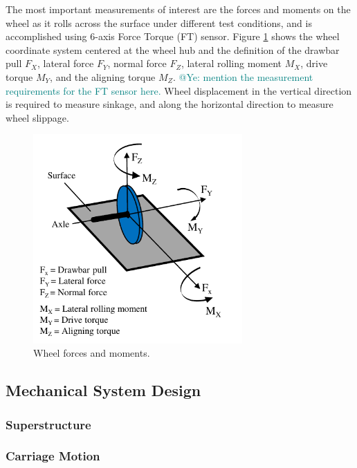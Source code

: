 \documentclass{article}
\begin{document}
The most important measurements of interest are the forces and moments on the wheel as it rolls across the surface under different test conditions, and is accomplished using 6-axis Force Torque (FT) sensor. Figure \ref{fig:wheel-forces-and-moments} shows the wheel coordinate system centered at the wheel hub and the definition of the drawbar pull $F_X$, lateral force $F_Y$, normal force $F_Z$, lateral rolling moment $M_X$, drive torque $M_Y$, and the aligning torque $M_Z$. \textcolor{teal}{@Ye: mention the measurement requirements for the FT sensor here.} Wheel displacement in the vertical direction is required to measure sinkage, and along the horizontal direction to measure wheel slippage. 

\begin{figure}[hbt!]
\centering
\includegraphics[width=3.15in]{general-images/wheel-forces-and-moments.pdf}
\caption{Wheel forces and moments.}
\label{fig:wheel-forces-and-moments}
\end{figure}


\subsection{Mechanical System Design}



\subsubsection{Superstructure}


\subsubsection{Carriage Motion}
\label{subsubsec:carriage-motion}
\end{document}
